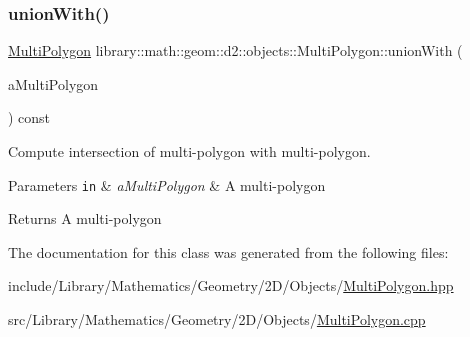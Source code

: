 \subsubsection{\texorpdfstring{union\+With()}{unionWith()}}
{\footnotesize\ttfamily \hyperlink{classlibrary_1_1math_1_1geom_1_1d2_1_1objects_1_1_multi_polygon}{Multi\+Polygon} library\+::math\+::geom\+::d2\+::objects\+::\+Multi\+Polygon\+::union\+With (\begin{DoxyParamCaption}\item[{const \hyperlink{classlibrary_1_1math_1_1geom_1_1d2_1_1objects_1_1_multi_polygon}{Multi\+Polygon} \&}]{a\+Multi\+Polygon }\end{DoxyParamCaption}) const}



Compute intersection of multi-\/polygon with multi-\/polygon. 


\begin{DoxyParams}[1]{Parameters}
\mbox{\tt in}  & {\em a\+Multi\+Polygon} & A multi-\/polygon \\
\hline
\end{DoxyParams}
\begin{DoxyReturn}{Returns}
A multi-\/polygon 
\end{DoxyReturn}


The documentation for this class was generated from the following files\+:\begin{DoxyCompactItemize}
\item 
include/\+Library/\+Mathematics/\+Geometry/2\+D/\+Objects/\hyperlink{_multi_polygon_8hpp}{Multi\+Polygon.\+hpp}\item 
src/\+Library/\+Mathematics/\+Geometry/2\+D/\+Objects/\hyperlink{_multi_polygon_8cpp}{Multi\+Polygon.\+cpp}\end{DoxyCompactItemize}
